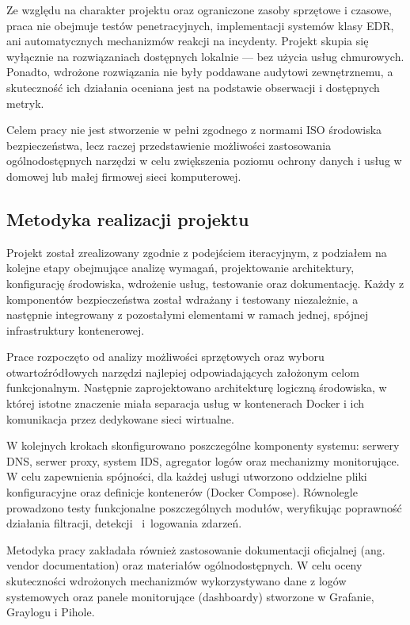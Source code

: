 \documentclass[
    left=2.5cm,         %
    right=2.5cm,        %
    top=2.5cm,          %
    bottom=3cm,         %
    bindingoffset=6mm,  %
    nohyphenation=true %
]{eiti/eiti-thesis} %
\begin{document}
Ze względu na charakter projektu oraz ograniczone zasoby sprzętowe i czasowe, praca nie obejmuje testów penetracyjnych, implementacji systemów klasy EDR, 
ani automatycznych mechanizmów reakcji na incydenty. Projekt skupia się wyłącznie na rozwiązaniach dostępnych lokalnie — bez użycia usług chmurowych. Ponadto, wdrożone rozwiązania nie były poddawane audytowi zewnętrznemu, a skuteczność ich działania oceniana jest na podstawie obserwacji i dostępnych metryk.

Celem pracy nie jest stworzenie w pełni zgodnego z normami ISO środowiska bezpieczeństwa, lecz raczej przedstawienie możliwości zastosowania ogólnodostępnych narzędzi w celu zwiększenia poziomu ochrony danych i usług w domowej lub małej firmowej sieci komputerowej.

\subsection{Metodyka realizacji projektu}

Projekt został zrealizowany zgodnie z podejściem iteracyjnym, z podziałem na kolejne etapy obejmujące analizę wymagań, projektowanie architektury, konfigurację środowiska, wdrożenie usług, testowanie oraz dokumentację. Każdy z komponentów bezpieczeństwa został wdrażany i testowany niezależnie, a następnie integrowany 
z pozostałymi elementami w ramach jednej, spójnej infrastruktury kontenerowej.

Prace rozpoczęto od analizy możliwości sprzętowych oraz wyboru otwartoźródłowych narzędzi najlepiej odpowiadających założonym celom funkcjonalnym. Następnie zaprojektowano architekturę logiczną środowiska, w której istotne znaczenie miała separacja usług w kontenerach Docker i ich komunikacja przez dedykowane sieci wirtualne.

W kolejnych krokach skonfigurowano poszczególne komponenty systemu: serwery DNS, serwer proxy, system IDS, agregator logów oraz mechanizmy monitorujące. W celu zapewnienia spójności, dla każdej usługi utworzono oddzielne pliki konfiguracyjne\cite{github-homenetguardian} oraz definicje kontenerów (Docker Compose)\cite{lukaszfd_dockercompose2024}. Równolegle prowadzono testy funkcjonalne poszczególnych modułów, weryfikując poprawność działania filtracji, detekcji ~i~logowania zdarzeń.

Metodyka pracy zakładała również zastosowanie dokumentacji oficjalnej (ang. vendor documentation) oraz materiałów ogólnodostępnych. W celu oceny skuteczności wdrożonych mechanizmów wykorzystywano dane z logów systemowych oraz panele monitorujące (dashboardy) stworzone w Grafanie, Graylogu i Pihole.
\end{document}
